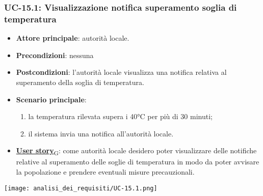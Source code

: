 \subsubsection{UC-15.1: Visualizzazione notifica superamento soglia di temperatura}
\begin{itemize}
	\item \textbf{Attore principale}: autorità locale.
	\item \textbf{Precondizioni}: nessuna
	\item \textbf{Postcondizioni}: l'autorità locale visualizza una notifica relativa al superamento della soglia di temperatura.
	\item \textbf{Scenario principale}:
	      \begin{enumerate}
		      \item la temperatura rilevata supera i 40°C per più di 30 minuti;
		      \item il sistema invia una notifica all'autorità locale.
	      \end{enumerate}
	\item \href{https://7last.github.io/docs/pb/documentazione-interna/glossario\#user-story}{\textbf{User story}\textsubscript{G}}:
	      come autorità locale desidero poter visualizzare delle notifiche relative al superamento delle soglie di temperatura
	      in modo da poter avvisare la popolazione e prendere eventuali misure precauzionali.
\end{itemize}
\begin{center}
	\texttt{[image: analisi\_dei\_requisiti/UC-15.1.png]}
\end{center}


